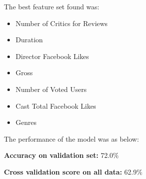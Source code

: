 \noindent
The best feature set found was:
\begin{itemize}
    \item Number of Critics for Reviews
    \item Duration
    \item Director Facebook Likes
    \item Gross
    \item Number of Voted Users
    \item Cast Total Facebook Likes
    \item Genres
\end{itemize}
\noindent
The performance of the model was as below:

\noindent
\textbf{Accuracy on validation set:} 72.0\%

\noindent
\textbf{Cross validation score on all data:} 62.9\%  

